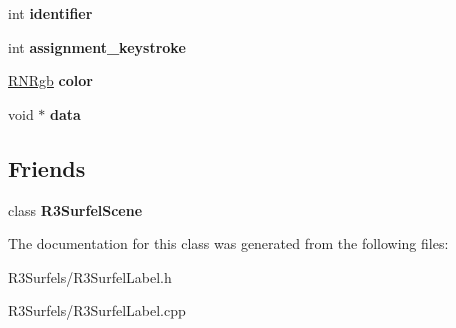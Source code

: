 \begin{DoxyCompactItemize}
\item 
int {\bfseries identifier}\hypertarget{class_r3_surfel_label_a1d91e8e830f8d2bc3e6b6608dc035122}{}\label{class_r3_surfel_label_a1d91e8e830f8d2bc3e6b6608dc035122}

\item 
int {\bfseries assignment\+\_\+keystroke}\hypertarget{class_r3_surfel_label_aed8f801a39dece745044f14008b60603}{}\label{class_r3_surfel_label_aed8f801a39dece745044f14008b60603}

\item 
\hyperlink{class_r_n_rgb}{R\+N\+Rgb} {\bfseries color}\hypertarget{class_r3_surfel_label_ac314cb5865128c9dbe6d4ab72afe343f}{}\label{class_r3_surfel_label_ac314cb5865128c9dbe6d4ab72afe343f}

\item 
void $\ast$ {\bfseries data}\hypertarget{class_r3_surfel_label_a1ed9c4b4e317412446cfd45d69213ca5}{}\label{class_r3_surfel_label_a1ed9c4b4e317412446cfd45d69213ca5}

\end{DoxyCompactItemize}
\subsection*{Friends}
\begin{DoxyCompactItemize}
\item 
class {\bfseries R3\+Surfel\+Scene}\hypertarget{class_r3_surfel_label_af9bb32c0eac7d1d54787bbc6b44586b6}{}\label{class_r3_surfel_label_af9bb32c0eac7d1d54787bbc6b44586b6}

\end{DoxyCompactItemize}


The documentation for this class was generated from the following files\+:\begin{DoxyCompactItemize}
\item 
R3\+Surfels/R3\+Surfel\+Label.\+h\item 
R3\+Surfels/R3\+Surfel\+Label.\+cpp\end{DoxyCompactItemize}

